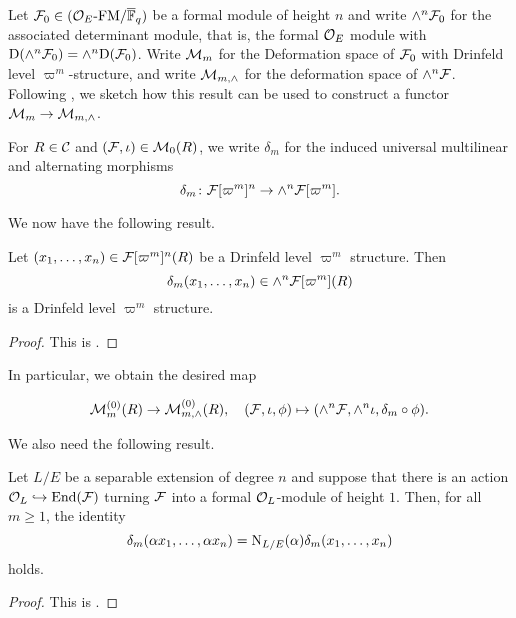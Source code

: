 \documentclass[../main.tex]{subfiles}
\begin{document}
Let $\mathcal{F}_0 \in {({\mathcal{O}_E}\text-\allowbreak\mathrm{FM}/{{\overline{\mathbb{F}}_q}})}$ be a formal module of height $n$ and 
write $\wedge^n\mathcal{F}_0$ for the associated determinant module, that is, the 
formal $\mathcal{O}_E$ module with $\mathrm{D}(\wedge^n\mathcal{F}_0) = \wedge^n\mathrm{D}(\mathcal{F}_0)$. Write
$\mathcal{M}_m$ for the Deformation space of $\mathcal{F}_0$ with Drinfeld level
$\varpi^m$-structure, and write $\mathcal{M}_{m, \wedge}$ for the deformation space of
$\wedge^n\mathcal{F}$. 
Following \cite{weinstein2016semistable}, we sketch how this result can be
used to construct a functor $\mathcal{M}_{m} \to \mathcal{M}_{m, \wedge}$. 

For $R\in\mathcal{C}$ and $(\mathcal{F}, \iota) \in \mathcal{M}_{0}(R)$, we write $\delta_m$ for the
induced universal multilinear and alternating morphisms
\begin{equation}\label{eq:determinantontorsionpoints}
  \delta_m \colon \mathcal{F}[\varpi^m]^n \to \wedge^n\mathcal{F}[\varpi^m].
\end{equation}

We now have the following result.

\begin{lem}\label{lem:DeterminantOfDrinfeldStructure}
  Let $(x_1, \dots, x_n) \in \mathcal{F}[\varpi^{m}]^n(R)$ be a Drinfeld level
  $\varpi^m$ structure. Then 
  \begin{equation*}
    \delta_m(x_1, \dots, x_n) \in \wedge^n\mathcal{F}[\varpi^m](R) 
  \end{equation*}
  is a Drinfeld level $\varpi^m$ structure.
\begin{proof}
  This is \cite[Proposition 2.11]{weinstein2016semistable}.
\end{proof}
\end{lem}

In particular, we obtain the desired map

\begin{equation*}
  \mathcal{M}_m^{(0)}(R) \to \mathcal{M}^{(0)}_{m, \wedge}(R), \quad (\mathcal{F}, \iota, \phi)
  \mapsto (\wedge^n \mathcal{F}, \wedge^n \iota, \delta_m \circ \phi).
\end{equation*}

We also need the following result.

\begin{lem}\label{lem:WeinsteinDeterminantAndNorm}
  Let $L/E$ be a separable extension of degree $n$ and suppose that there 
  is an action $\mathcal{O}_L \hookrightarrow \operatorname{End}(\mathcal{F})$ turning $\mathcal{F}$ into a formal
  $\mathcal{O}_L$-module of height $1$. Then, for all $m \geq 1$, the identity
  \begin{equation*}
    \delta_m(\alpha x_1, \dots, \alpha x_n) = \mathrm{N}_{L/E}(\alpha) \delta_m
    (x_1, \dots, x_n)
  \end{equation*}
  holds. 
  \begin{proof}
    This is \cite[Lemma 2.12]{weinstein2016semistable}.
  \end{proof}
\end{lem}
\end{document}

